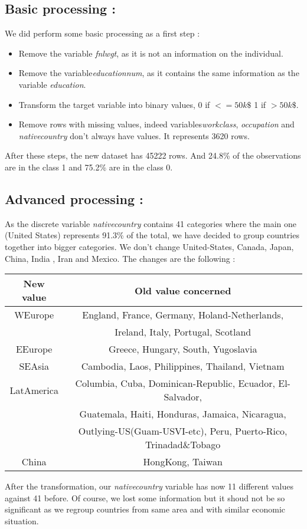 \documentclass[12pt]{article}
\begin{document}
\subsection{Basic processing : }
We did perform some basic processing as a first step : 
\begin{itemize}
\item Remove the variable \emph{fnlwgt}, as it is not an information on the individual.
\item Remove the variable\emph{educationnum}, as it contains the same information as the variable \emph{education}.
\item Transform the target variable into binary values,  0 if $<=50k\$$ 1 if $>50k\$$.
\item Remove rows with missing values, indeed variables\emph{workclass}, \emph{occupation} and \emph{nativecountry} don't always have values. It represents 3620 rows.
\end{itemize}
After these steps, the new dataset has 45222 rows. And 24.8\% of the observations are in the class 1 and 75.2\% are in the class 0.
\subsection{Advanced processing :}
As the discrete variable \emph{nativecountry} contains 41 categories where the main one (United States) represents 91.3\% of the total, we have decided to group countries together into bigger categories. We don't change United-States, Canada, Japan, China, India , Iran and Mexico. The changes are the following :

\begin{center}

\begin{tabular}{|c|c|}
\hline
New value & Old value concerned \\
\hline
WEurope & England, France, Germany, Holand-Netherlands,\\
& Ireland, Italy, Portugal, Scotland\\
\hline
EEurope & Greece, Hungary, South, Yugoslavia\\
\hline
SEAsia & Cambodia, Laos, Philippines, Thailand, Vietnam\\
\hline
 LatAmerica & Columbia, Cuba, Dominican-Republic, Ecuador, El-Salvador, \\
&Guatemala, Haiti, Honduras, Jamaica, Nicaragua, \\
&Outlying-US(Guam-USVI-etc), Peru, Puerto-Rico, Trinadad\&Tobago \\
\hline
China & HongKong, Taiwan \\
\hline
\end{tabular}
\end{center}
After the transformation, our \emph{nativecountry} variable has now 11 different values against 41 before. Of course, we lost some information but it shoud not be so significant as we regroup countries from same area and with similar economic situation.
\end{document}
